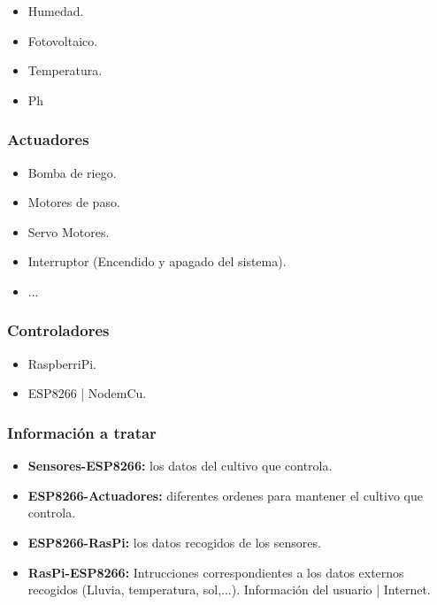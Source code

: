 \documentclass[12pt,a4paper,titlepage,oneside]{report}
\begin{document}
		\begin{itemize}
			\item Humedad.
			\item Fotovoltaico.
			\item Temperatura.
			\item Ph
		\end{itemize}

	\subsubsection*{Actuadores}

		\begin{itemize}
			\item Bomba de riego.
			\item Motores de paso.
			\item Servo Motores.
			\item Interruptor (Encendido y apagado del sistema).
			\item ...
		\end{itemize}			
	
	\subsubsection*{Controladores}
		
		\begin{itemize}
			\item RaspberriPi.
			\item ESP8266 | NodemCu.
		\end{itemize}			
	
	\subsubsection*{Información a tratar}
		
		\begin{itemize}
			\item \textbf{Sensores-ESP8266:} los datos del cultivo que controla.
			\item \textbf{ESP8266-Actuadores:} diferentes ordenes para mantener el cultivo que controla.
			\item \textbf{ESP8266-RasPi:} los datos recogidos de los sensores.
			\item \textbf{RasPi-ESP8266:} Intrucciones correspondientes a los datos externos recogidos (Lluvia, temperatura, sol,...). Información del usuario | Internet.
			
		\end{itemize}
\end{document}
